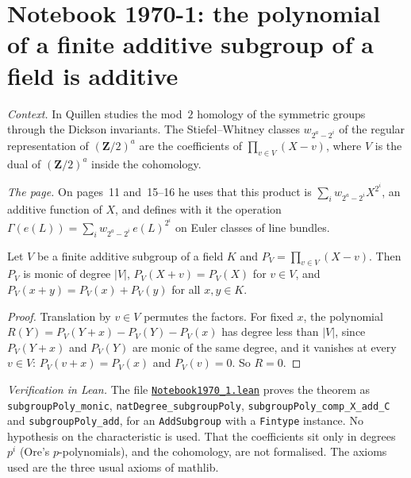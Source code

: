 \section[Notebook 1970-1: the polynomial of a finite additive subgroup is additive]{Notebook 1970-1: the polynomial of a finite additive subgroup of a field is additive\protect{}}\label{sec:quillen-1970-1}

\emph{Context.} In  Quillen studies the mod~$2$ homology of the symmetric groups through the Dickson invariants. The Stiefel--Whitney classes $w_{2^a - 2^i}$ of the regular representation of $(\mathbf Z/2)^a$ are the coefficients of $\prod_{v \in V}(X - v)$, where $V$ is the dual of $(\mathbf Z/2)^a$ inside the cohomology.

\emph{The page.} On pages~11 and~15--16 he uses that this product is $\sum_i w_{2^a - 2^i}X^{2^i}$, an additive function of $X$, and defines with it the operation $\Gamma(e(L)) = \sum_i w_{2^a-2^i}\,e(L)^{2^i}$ on Euler classes of line bundles.

\begin{encadre}
\begin{theoreme}\label{thm:quillen-1970-1}
Let $V$ be a finite additive subgroup of a field $K$ and $P_V = \prod_{v \in V}(X - v)$. Then $P_V$ is monic of degree $|V|$, $P_V(X + v) = P_V(X)$ for $v \in V$, and $P_V(x + y) = P_V(x) + P_V(y)$ for all $x, y \in K$.
\end{theoreme}
\end{encadre}

\begin{proof}
Translation by $v \in V$ permutes the factors. For fixed $x$, the polynomial $R(Y) = P_V(Y + x) - P_V(Y) - P_V(x)$ has degree less than $|V|$, since $P_V(Y + x)$ and $P_V(Y)$ are monic of the same degree, and it vanishes at every $v \in V$: $P_V(v + x) = P_V(x)$ and $P_V(v) = 0$. So $R = 0$.
\end{proof}

\emph{Verification in Lean.} The file \href{\leanblobmain/Notebook1970_1.lean}{\texttt{Notebook1970\_1.\allowbreak{}lean}} proves the theorem as \texttt{subgroupPoly\_monic}, \texttt{natDegree\_subgroupPoly}, \texttt{subgroupPoly\_comp\_X\_add\_C} and \texttt{subgroupPoly\_add}, for an \texttt{AddSubgroup} with a \texttt{Fintype} instance. No hypothesis on the characteristic is used. That the coefficients sit only in degrees $p^i$ (Ore's $p$-polynomials), and the cohomology, are not formalised. The axioms used are the three usual axioms of mathlib.


